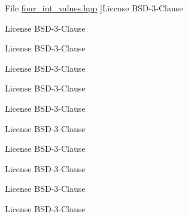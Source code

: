 \begin{DoxyRefList}
%
File \hyperlink{four__int__values_8hpp}{four\+\_\+int\+\_\+values.hpp} ]License B\+S\+D-\/3-\/\+Clause  
\item[\label{license__license000015}%
\Hypertarget{license__license000015}%
File \hyperlink{get__data_8cpp}{get\+\_\+data.cpp} ]License B\+S\+D-\/3-\/\+Clause  
\item[\label{license__license000002}%
\Hypertarget{license__license000002}%
File \hyperlink{main_8cpp}{main.cpp} ]License B\+S\+D-\/3-\/\+Clause  
\item[\label{license__license000025}%
\Hypertarget{license__license000025}%
File \hyperlink{serializable__exchange_8hpp}{serializable\+\_\+exchange.hpp} ]License B\+S\+D-\/3-\/\+Clause  
\item[\label{license__license000026}%
\Hypertarget{license__license000026}%
File \hyperlink{serializable__exchange_8hxx}{serializable\+\_\+exchange.hxx} ]License B\+S\+D-\/3-\/\+Clause 

License B\+S\+D-\/3-\/\+Clause  
\item[\label{license__license000009}%
\Hypertarget{license__license000009}%
File \hyperlink{set__data_8cpp}{set\+\_\+data.cpp} ]License B\+S\+D-\/3-\/\+Clause 

License B\+S\+D-\/3-\/\+Clause 

License B\+S\+D-\/3-\/\+Clause  
\item[\label{license__license000031}%
\Hypertarget{license__license000031}%
File \hyperlink{shared__memory_8cpp}{shared\+\_\+memory.cpp} ]License B\+S\+D-\/3-\/\+Clause  
\item[\label{license__license000024}%
\Hypertarget{license__license000024}%
File \hyperlink{shared__memory_8hpp}{shared\+\_\+memory.hpp} ]License B\+S\+D-\/3-\/\+Clause 


\end{DoxyRefList}
